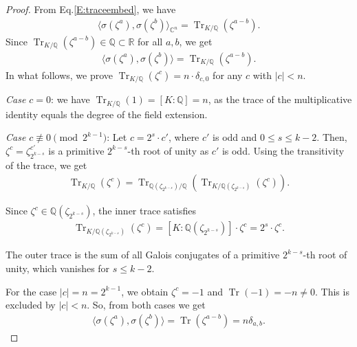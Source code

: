 \documentclass[11pt,a4paper]{article}
\theoremstyle{plain}
\theoremstyle{definition}
\theoremstyle{remark}
\DeclareMathOperator{\Tr}{Tr}
\newcommand{\Q}{\mathbb{Q}}
\newcommand{\R}{\mathbb{R}}
\newcommand{\C}{\mathbb{C}}
\begin{document}
\begin{proof} From Eq.\eqref{E:traceembed}, we have 
\begin{align}
\langle\sigma(\zeta^a), \sigma(\zeta^b)\rangle_{\C^n}=\Tr_{K/\Q}(\zeta^{a-b}).
\label{E:innprodeq}
\end{align}
Since $\Tr_{K/\Q}(\zeta^{a-b})\in\Q\subset\R$ for all $a, b$, we get 
\begin{align}
\langle\sigma(\zeta^a), \sigma(\zeta^b)\rangle=\Tr_{K/\Q}(\zeta^{a-b}).
\label{E:innprodeqb}
\end{align}
In what follows, we prove $\Tr_{K/\Q}(\zeta^c)=n\cdot\delta_{c,0}$ for any $c$ with $|c| < n$.

\textit{Case $c=0$}: we have $\Tr_{K/\Q}(1)=[K: \Q]=n$, as the trace of the multiplicative identity equals the degree of the field extension.

\textit{Case $c\not\equiv 0 \pmod{2^{k-1}}$}: Let $c=2^s \cdot c'$, where $c'$ is odd and $0\le s\le k-2$. Then, $\zeta^c=\zeta_{2^{k-s}}^{c'}$ is a primitive $2^{k-s}$-th root of unity as $c'$ is odd. Using the transitivity of the trace, we get 
\begin{align}
\Tr_{K/\Q}(\zeta^c)=\Tr_{\Q(\zeta_{2^{k-s}})/\Q}( \Tr_{K/\Q(\zeta_{2^{k-s}})}(\zeta^c) ).
\label{E:traceq}
\end{align}

Since $\zeta^c \in \Q(\zeta_{2^{k-s}})$, the inner trace satisfies 
\begin{align}
\Tr_{K/\Q(\zeta_{2^{k-s}})}(\zeta^c)=[K:\Q(\zeta_{2^{k-s}})] \cdot \zeta^c=2^s \cdot \zeta^c.
\label{E:intraceq}
\end{align}

The outer trace is the sum of all Galois conjugates of a primitive $2^{k-s}$-th root of unity, which vanishes for $s\le k-2$.

For the case $|c|=n=2^{k-1}$, we obtain $\zeta^c=-1$ and $\Tr(-1)=-n \neq 0$. This is excluded by $|c|<n$. So, from both cases we get 
\begin{align}
\langle\sigma(\zeta^a),\sigma(\zeta^b)\rangle=\Tr(\zeta^{a-b})=n\delta_{a,b}. 
\label{E:inorth}
\end{align}

\end{proof}
\end{document}
